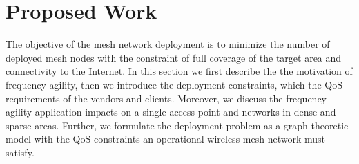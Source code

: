 \chapter{Proposed Work} 
\label{ch:futurework}

The objective of the mesh network deployment is to minimize the number of 
deployed mesh nodes with the constraint of full coverage of the target area 
and connectivity to the Internet. In this section we first describe the 
the motivation of frequency agility, then we introduce 
the deployment constraints, which the QoS requirements of the vendors and clients.
Moreover, we discuss the frequency agility application impacts 
on a single access point and networks in dense and sparse areas.
Further, we formulate the deployment problem as a graph-theoretic model
with the QoS constraints an operational wireless mesh network must satisfy. 

